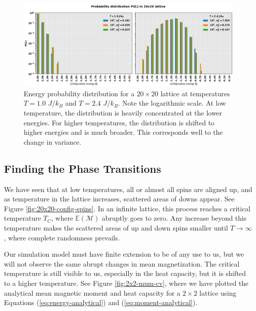 \documentclass[]{article}
\begin{document}
\begin{figure}[!h]
	\centering
	\includegraphics[width=1\linewidth]{./figs/20x20-prob-dist.png}
	\caption{Energy probability distribution for a $20 \times 20$ lattice at temperatures $T = 1.0$ $J/k_B$ and $T = 2.4$ $J/k_B$. Note the logarithmic scale. At low temperature, the distribution is heavily concentrated at the lower energies. For higher temperatures, the distribution is shifted to higher energies and is much broader. This corresponds well to the change in variance.}
	\label{fig:20x20-prob-dist}
\end{figure}

\subsection{Finding the Phase Transitions} \label{sec:phase-trans}
We have seen that at low temperatures, all or almost all spins are aligned up, and as temperature in the lattice increases, scattered areas of downs appear. See Figure \ref{fig:20x20-config-spins}. In an infinite lattice, this process reaches a critical temperature $T_C$, where $\mathbb{E}(\mathcal{M})$ abruptly goes to zero. Any increase beyond this temperature makes the scattered areas of up and down spins smaller until $T \rightarrow \infty$, where complete randomness prevails.

Our simulation model must have finite extension to be of any use to us, but we will not observe the same abrupt changes in mean magnetization. The critical temperature is still visible to us, especially in the heat capacity, but it is shifted to a higher temperature. See Figure \ref{fig:2x2-mum-cv}, where we have plotted the analytical mean magnetic moment and heat capacity for a $2 \times 2$ lattice using Equations (\ref{eq:energy-analytical}) and (\ref{eq:moment-analytical}). 
\end{document}
